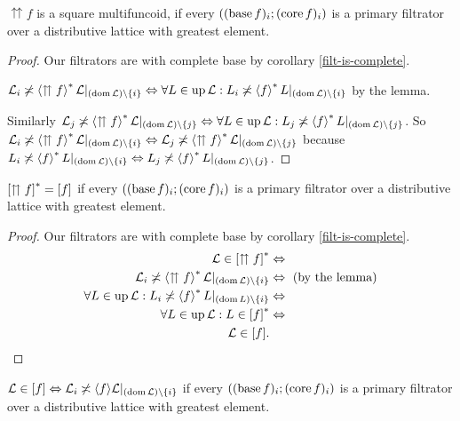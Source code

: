 \begin{prop}
$\upuparrows f$ is a square multifuncoid, if every $((\operatorname{base} f)_{i};(\operatorname{core} f)_{i})$
is a primary filtrator over a distributive lattice with greatest element.\end{prop}
\begin{proof}
Our filtrators are with complete base by corollary \ref{filt-is-complete}.

$\mathcal{L}_{i}\not\asymp\left\langle \upuparrows f\right\rangle ^{\ast}\mathcal{L}|_{(\operatorname{dom}\mathcal{L})\setminus\{i\}}\Leftrightarrow\forall L\in\operatorname{up}\mathcal{L}:L_{i}\not\asymp\left\langle f\right\rangle ^{\ast}L|_{(\operatorname{dom}\mathcal{L})\setminus\{i\}}$
by the lemma.

Similarly $\mathcal{L}_{j}\not\asymp\left\langle \upuparrows f\right\rangle ^{\ast}\mathcal{L}|_{(\operatorname{dom}\mathcal{L})\setminus\{j\}}\Leftrightarrow\forall L\in\operatorname{up}\mathcal{L}:L_{j}\not\asymp\left\langle f\right\rangle ^{\ast}L|_{(\operatorname{dom}\mathcal{L})\setminus\{j\}}$.
So $\mathcal{L}_{i}\not\asymp\left\langle \upuparrows f\right\rangle ^{\ast}\mathcal{L}|_{(\operatorname{dom}\mathcal{L})\setminus\{i\}}\Leftrightarrow\mathcal{L}_{j}\not\asymp\left\langle \upuparrows f\right\rangle ^{\ast}\mathcal{L}|_{(\operatorname{dom}\mathcal{L})\setminus\{j\}}$
because $L_{i}\not\asymp\left\langle f\right\rangle ^{\ast}L|_{(\operatorname{dom}\mathcal{L})\setminus\{i\}}\Leftrightarrow L_{j}\not\asymp\left\langle f\right\rangle ^{\ast}L|_{(\operatorname{dom}\mathcal{L})\setminus\{j\}}$.\end{proof}
\begin{prop}
$\mathord{\mathrel{\left[\upuparrows f\right]^{\ast}}}=\mathord{\mathrel{\left[f\right]}}$ if every
$((\operatorname{base} f)_{i};(\operatorname{core} f)_{i})$ is a primary filtrator over a distributive
lattice with greatest element.\end{prop}
\begin{proof}
Our filtrators are with complete base by corollary \ref{filt-is-complete}.
\begin{align*}
\mathcal{L}\in\mathord{\mathrel{\left[\upuparrows f\right]^{\ast}}} & \Leftrightarrow\\
\mathcal{L}_{i}\not\asymp\left\langle \upuparrows f\right\rangle ^{\ast}\mathcal{L}|_{(\operatorname{dom}\mathcal{L})\setminus\{i\}} & \Leftrightarrow\text{ (by the lemma)}\\
\forall L\in\operatorname{up}\mathcal{L}:L_{i}\not\asymp\left\langle f\right\rangle ^{\ast}L|_{(\operatorname{dom} L)\setminus\{i\}} & \Leftrightarrow\\
\forall L\in\operatorname{up}\mathcal{L}:L\in\mathord{\mathrel{\left[f\right]^{\ast}}} & \Leftrightarrow\\
\mathcal{L}\in\mathord{\mathrel{\left[f\right]}}.
\end{align*}
\end{proof}
\begin{prop}
$\mathcal{L}\in\mathord{\mathrel{\left[f\right]}}\Leftrightarrow\mathcal{L}_{i}\not\asymp\langle f\rangle\mathcal{L}|_{(\operatorname{dom}\mathcal{L})\setminus\{i\}}$
if every $((\operatorname{base} f)_{i};(\operatorname{core} f)_{i})$ is a primary filtrator over
a distributive lattice with greatest element.\end{prop}
